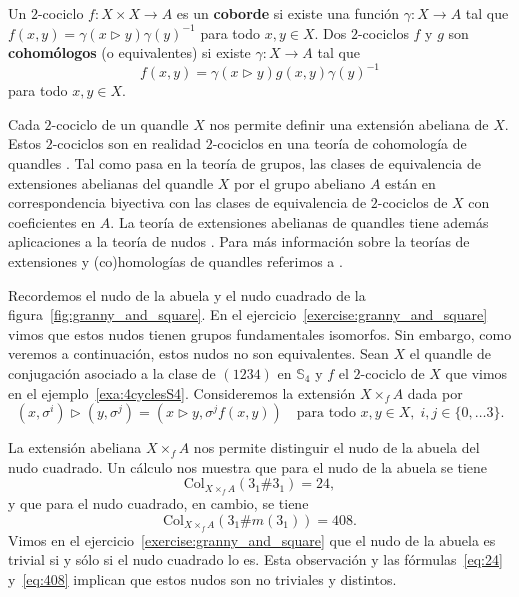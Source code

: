 \documentclass[graybox]{svmult}
\newcommand{\Sym}{\mathbb{S}}
\begin{document}
\begin{definition}
	\label{$2$-cociclos!cohómologos}
	\label{$2$-cociclos!equivalentes}
	Un $2$-cociclo $f\colon X\times X\to A$ es un \textbf{coborde} si existe una función 
	$\gamma\colon X\to A$ tal que $f(x,y)=\gamma(x\triangleright
	y)\gamma(y)^{-1}$ para todo $x,y\in X$.
	Dos $2$-cociclos $f$ y $g$ son \textbf{cohomólogos} (o equivalentes) si
	existe $\gamma\colon X\to A$ tal que 
	\[
		f(x,y)=\gamma(x\triangleright y)g(x,y)\gamma(y)^{-1}
	\]
	para todo $x,y\in X$.  
\end{definition}

Cada $2$-cociclo de un quandle $X$
nos permite definir una extensión abeliana de $X$. Estos $2$-cociclos son
en realidad $2$-cociclos en una teoría de cohomología de quandles
\cite{MR1990571}. Tal como pasa en la teoría de grupos, las clases de
equivalencia de extensiones abelianas del quandle $X$ por el grupo abeliano
$A$ están en correspondencia biyectiva con las clases de equivalencia de
$2$-cociclos de $X$ con coeficientes en $A$. La teoría de extensiones
abelianas de quandles tiene además aplicaciones a la teoría de nudos
\cite{MR2008876}.  Para más información sobre la teorías de extensiones y
(co)homologías de quandles referimos a \cite{MR1994219}.

\begin{example}
    \label{exa:granny_vs_square:2}
	Recordemos el nudo de la abuela y el nudo cuadrado de la
	figura~\ref{fig:granny_and_square}. En el
	ejercicio~\ref{exercise:granny_and_square} vimos que estos nudos tienen grupos
	fundamentales isomorfos. Sin embargo, como veremos a continuación, estos
	nudos no son equivalentes.  Sean $X$ el quandle de conjugación asociado a
	la clase de $(1234)$ en $\Sym_4$ y $f$ el $2$-cociclo de $X$ que vimos en el
	ejemplo~\ref{exa:4cyclesS4}.  Consideremos la extensión $X\times_fA$ dada
	por
    \[
        (x,\sigma^i)\triangleright (y,\sigma^j)=(x\triangleright y,\sigma^jf(x,y))
        \quad\text{para todo $x,y\in X,\;i,j\in\{0,\dots3\}$.}
    \]

    La extensión abeliana
    $X\times_fA$ nos permite distinguir el nudo de la abuela del nudo cuadrado.  Un
    cálculo nos muestra que para el nudo de la abuela se tiene
	\begin{equation}
		\label{eq:24}
    	\mathrm{Col}_{X\times_fA}(3_1\#3_1)=24,
	\end{equation}
    y que para el nudo cuadrado, en cambio, se tiene 
	\begin{equation}
		\label{eq:408}
    	\mathrm{Col}_{X\times_fA}(3_1\#m(3_1))=408.
	\end{equation}
	Vimos en el ejercicio~\ref{exercise:granny_and_square} que el nudo de la abuela
	es trivial si y sólo si el nudo cuadrado lo es. Esta observación y las
	fórmulas~\eqref{eq:24} y~\eqref{eq:408} implican que estos nudos son no
	triviales y distintos.
\end{example}
\end{document}
